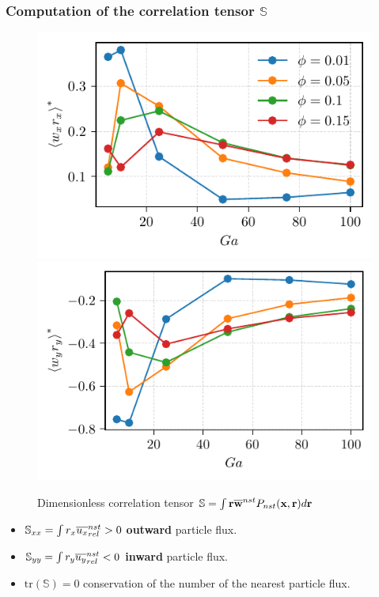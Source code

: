\documentclass{sintefbeamer}
\begin{document}
\begin{frame}
  \frametitle{Computation of the correlation tensor $\mathbb{S}$ }
  \begin{figure}
    \begin{centering}
      \includegraphics[height=0.25\textwidth]{image/HOMOGENEOUS/fPA/URxx.pdf}
      \includegraphics[height=0.25\textwidth]{image/HOMOGENEOUS/fPA/URyy.pdf}
      \caption{Dimensionless correlation tensor $\mathbb{S} =  \int \textbf{r}\overline{\textbf{w}}^{nst} P_{nst}(\textbf{x},\textbf{r})d\textbf{r}$}
    \end{centering}
  \end{figure}

  \begin{itemize}
    \item $\mathbb{S}_{xx} = \int r_x\overline{u_x}^{nst}_{rel} > 0$ \textbf{outward} particle flux.  
    \item $\mathbb{S}_{yy} = \int r_y\overline{u_y}^{nst}_{rel} < 0$ \textbf{inward} particle flux. 
    \item $\text{tr}\left(\mathbb{S}\right) = 0$ conservation of the number of the nearest particle flux. 
  \end{itemize} 
\end{frame}
\end{document}
